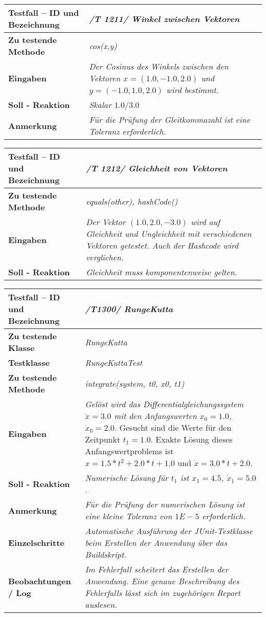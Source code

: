 \begin{longtable}{|p{7cm}|p{10cm}|}
\hline
\textbf{Testfall -- ID und Bezeichnung} & \textit{ /T 1211/ Winkel zwischen Vektoren} \\
\hline
\textbf{Zu testende Methode} &  \textit{cos(x,y)} \\
\hline
\textbf{Eingaben} & \textit{Der Cosinus des Winkels zwischen den Vektoren 
$x=(1.0, -1.0, 2.0)$ und $y=(-1.0, 1.0, 2.0)$ wird bestimmt.}\\
\hline
\textbf{Soll - Reaktion} & \textit{Skalar $1.0/3.0$} \\
\hline
\textbf{Anmerkung} & \textit{Für die Prüfung der Gleitkommazahl ist eine 
Toleranz erforderlich.} \\
\hline
\end{longtable}
\begin{longtable}{|p{7cm}|p{10cm}|}
\hline
\textbf{Testfall -- ID und Bezeichnung} & \textit{ /T 1212/ Gleichheit von Vektoren} \\
\hline
\textbf{Zu testende Methode} &  \textit{equals(other), hashCode()} \\
\hline
\textbf{Eingaben} & \textit{Der Vektor $(1.0, 2.0, -3.0)$ wird auf Gleichheit und
Ungleichheit mit verschiedenen Vektoren getestet. Auch der Hashcode wird verglichen.}\\
\hline
\textbf{Soll - Reaktion} & \textit{Gleichheit muss komponentenweise gelten.} \\
\hline
\end{longtable}

\begin{longtable}{|p{7cm}|p{10cm}|}
\hline
\textbf{Testfall -- ID und Bezeichnung} &  \textit{/T1300/ RungeKutta} \\
\hline
\textbf{Zu testende Klasse} &  \textit{RungeKutta} \\
\hline
\textbf{Testklasse} &  \textit{RungeKuttaTest} \\
\hline
\textbf{Zu testende Methode} &  \textit{integrate(system, t0, x0, t1)}\\
\hline
\textbf{Eingaben} & \textit{Gelöst wird das Differentialgleichungssystem $\ddot{x} = 3.0$ mit
den Anfangswerten $x_0 = 1.0$, $\dot{x}_0 = 2.0$}. Gesucht sind die Werte für den Zeitpunkt
$t_1 = 1.0$. Exakte Lösung dieses Anfangswertproblems ist $x = 1.5 * t^2 + 2.0 * t + 1.0$ und $\dot{x} = 3.0 * t + 2.0$. \\
\hline
\textbf{Soll - Reaktion} & \textit{Numerische Lösung für $t_1$ ist $x_1 = 4.5$, $\dot{x}_1 = 5.0$}. \\
\hline
\textbf{Anmerkung} & \textit{Für die Prüfung der numerischen Lösung ist eine kleine 
Toleranz von $1E-5$ erforderlich.} \\
\hline
\textbf{Einzelschritte} &  \textit{Automatische Ausführung der JUnit-Testklasse beim Erstellen
der Anwendung über das Buildskript.} \\
\hline
\textbf{Beobachtungen / Log} &  \textit{Im Fehlerfall scheitert das Erstellen der Anwendung.
Eine genaue Beschreibung des Fehlerfalls lässt sich im zugehörigen Report auslesen.} \\
\hline
\end{longtable}
